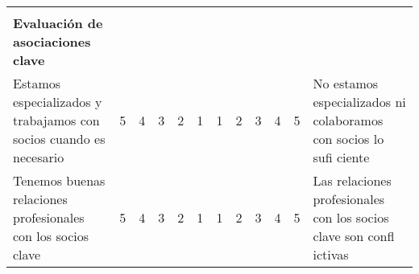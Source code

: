 \documentclass[11pt]{book}
\begin{document}
\begin{table}[htbp]
\begin{tabular}{p{14.285em}ccccc|cccccp{12em}}
    \multicolumn{1}{r}{} &       &       &       &       & \multicolumn{1}{c}{} &       &       &       &       &       & \multicolumn{1}{r}{} \\
    \textbf{Evaluación de asociaciones clave} &       &       &       &       & \multicolumn{1}{c}{} &       &       &       &       &       & \multicolumn{1}{r}{} \\
    Estamos especializados y trabajamos con socios cuando es necesario & 5     & 4     & 3     & 2     & 1     & 1     & 2     & 3     & 4     & 5     & No estamos especializados ni colaboramos con socios lo sufi ciente \\
    Tenemos buenas relaciones profesionales con los socios clave & 5     & 4     & 3     & 2     & 1     & 1     & 2     & 3     & 4     & 5     & Las relaciones profesionales con los socios clave son confl ictivas \\
    \end{tabular}%
  \label{tab:addlabel}%
\end{table}%
\end{document}

